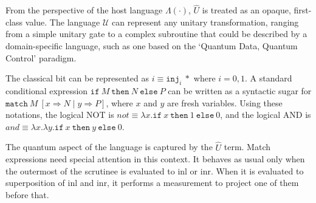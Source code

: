 From the perspective of the host language $\Lambda(\cdot)$, $\hat{U}$ is treated as an opaque, first-class value.
The language $\mathcal{U}$ can represent any unitary transformation, ranging from a simple unitary gate to a complex subroutine that could be described by a domain-specific language, such as one based on the `Quantum Data, Quantum Control' paradigm.
\begin{ex} \label{ex:classical}
  The classical bit can be represented as $i \equiv \texttt{inj}_i\ *$ where $i=0,1$.
  A standard conditional expression $\texttt{if}\ M\ \texttt{then}\ N\ \texttt{else}\ P$ can be written as a syntactic sugar for $\texttt{match}\ M\ [x\Rightarrow N\mid y\Rightarrow P]$, where $x$ and $y$ are fresh variables.
  Using these notations, the logical NOT is $\textit{not} \equiv \lambda x.\texttt{if}\ x\ \texttt{then}\ 1\ \texttt{else}\ 0$, and the logical AND is $\textit{and} \equiv \lambda x.\lambda y.\texttt{if}\ x\ \texttt{then}\ y\ \texttt{else}\ 0$.
\end{ex}
The quantum aspect of the language is captured by the $\hat{U}$ term.
Match expressions need special attention in this context.
It behaves as usual only when the outermost of the scrutinee is evaluated to inl or inr.
When it is evaluated to superposition of inl and inr, it performs a measurement to project one of them before that.
